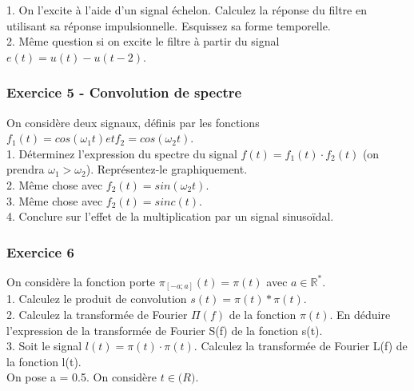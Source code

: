	1. On l'excite à l'aide d'un signal échelon. Calculez la réponse du filtre en utilisant sa réponse impulsionnelle. Esquissez sa forme temporelle.\\
	
	2. Même question si on excite le filtre à partir du signal $e(t)=u(t)-u(t-2)$.\\


	
	\subsubsection{Exercice 5 - Convolution de spectre}
	
	On considère deux signaux, définis par les fonctions $f_{1}(t) = cos(\omega_{1}t) et f_{2} = cos(\omega_{2}t)$. \\
	
	1. Déterminez l'expression du spectre du signal $f(t)=f_{1}(t)\cdot f_{2}(t)$ (on prendra $\omega_{1} > \omega_{2}$). Représentez-le graphiquement.\\
	
	2. Même chose avec $f_{2}(t) = sin(\omega_{2}t)$.\\
	
	3. Même chose avec $f_{2}(t) = sinc(t)$.\\
	
	4. Conclure sur l'effet de la multiplication par un signal sinusoïdal.\\

	
	
	\subsubsection{Exercice 6}
	
	On considère la fonction porte $\pi_{[-a;a]}(t)=\pi(t)$ avec $a \in \mathbb{R^{*}}$.\\
	
	1. Calculez le produit de convolution $s(t)=\pi(t)*\pi(t)$.\\
	
	2. Calculez la transformée de Fourier $\Pi(f)$ de la fonction $\pi(t)$. En déduire l'expression de la transformée de Fourier S(f) de la fonction s(t).\\
	
	3. Soit le signal $l(t)=\pi(t) \cdot \pi(t)$. Calculez la transformée de Fourier L(f) de la fonction l(t).\\
	
	On pose a = 0.5. On considère $t \in \mathbb(R)$.
	
